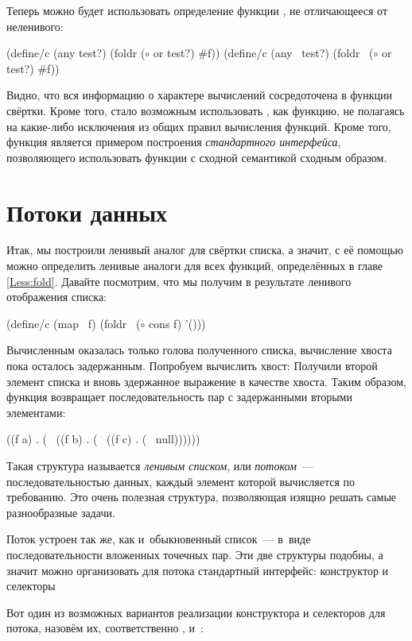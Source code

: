 Теперь можно будет использовать определение функции , не отличающееся от неленивого:
\begin{SchemeCode}[emph={el,res,test?,lst}]
(define/c (any test?)  (foldr  ($\circ$ or test?) #f))
(define/c (any~ test?) (foldr~ ($\circ$ or test?) #f))
\end{SchemeCode}
Видно, что вся информацию о характере вычислений сосредоточена в функции свёртки. Кроме того, стало возможным использовать , как функцию, не полагаясь на какие-либо исключения из общих правил вычисления функций.
Кроме того, функция  является примером построения \emph{стандартного интерфейса}, позволяющего использовать функции с сходной семантикой сходным образом.

\section[2]{Потоки данных}%
%
%
Итак, мы построили ленивый аналог для свёртки списка, а значит, с её помощью можно определить ленивые аналоги для всех функций, определённых в главе \ref{Less:fold}. Давайте посмотрим, что мы получим в результате ленивого отображения списка:
\begin{Definition}
(define/c (map~ f) (foldr~ ($\circ$ cons f) '())) 
\end{Definition}
Вычисленным оказалась только голова полученного списка, вычисление хвоста пока осталось задержанным. Попробуем вычислить хвост:
Получили второй элемент списка и вновь здержанное выражение в качестве хвоста. Таким образом, функция  возвращает последовательность пар с задержанными вторыми элементами:
\begin{SchemeCode}
((f a) . (~ ((f b) . (~ ((f c) . (~ null))))))
\end{SchemeCode}
Такая структура называется \emph{ленивым списком}, или \emph{потоком}~--- последовательностью данных, каждый элемент которой вычисляется по требованию. Это очень полезная структура, позволяющая изящно решать самые разнообразные задачи.

Поток устроен так же, как и~обыкновенный список~--- в~виде последовательности вложенных точечных пар. Эти две структуры подобны, а значит можно организовать для потока стандартный интерфейс: конструктор и селекторы

\label{lazy-cons}Вот один из возможных вариантов реализации конструктора и селекторов для потока, назовём их, соответственно ,  и~:

